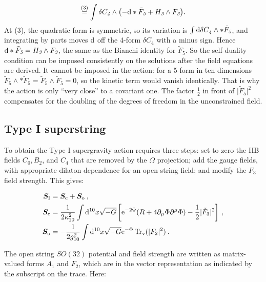 \begin{tcolorbox}[breakable]
\begin{remark}
\begin{align*}
			\overset{(3)}{=} \int\delta C_{\textit{4}}\wedge\bigl(-\mathrm{d}\ast\tilde F_{\textit{5}}+H_{\textit{3}}\wedge F_{\textit{3}}\bigr) .
		\end{align*}
		At (3), the quadratic form is symmetric, so its variation is $\int\mathrm{d}\delta C_{\textit{4}}\wedge\ast\tilde F_{\textit{5}}$, and integrating by parts moves $\mathrm{d}$ off the 4-form $\delta C_{\textit{4}}$ with a minus sign. Hence $\mathrm{d}\ast\tilde F_{\textit{5}}=H_{\textit{3}}\wedge F_{\textit{3}}$, the same as the Bianchi identity for $\tilde F_{\textit{5}}$. So the self-duality condition can be imposed consistently on the solutions after the field equations are derived. It cannot be imposed in the action: for a 5-form in ten dimensions $\tilde F_{\textit{5}}\wedge\ast\tilde F_{\textit{5}}=\tilde F_{\textit{5}}\wedge\tilde F_{\textit{5}}=0$, so the kinetic term would vanish identically. That is why the action is only ``very close'' to a covariant one. The factor $\frac12$ in front of $\lvert\tilde F_{\textit{5}}\rvert^{2}$ compensates for the doubling of the degrees of freedom in the unconstrained field.
	\end{remark}
\end{tcolorbox}

\subsection*{Type I superstring}
To obtain the Type I supergravity action requires three steps: set to zero the IIB fields $C_0, B_2$, and $C_4$ that are removed by the $\Omega$ projection; add the gauge fields, with appropriate dilaton dependence for an open string field; and modify the $F_3$ field strength. This gives:

\begin{subequations} \label{12.1.34}
	\begin{align}
		\bm{S}_{\text{I}} &= \bm{S}_{\text{c}} + \bm{S}_{\text{o}} \:, \label{12.1.34a} \\
		\bm{S}_{\text{c}} &= \frac{1}{2\kappa_{10}^{2}} \int \mathrm{d}^{10}x \sqrt{-G} \left[ \mathrm{e}^{-2\Phi} (R + 4\partial_{\mu}\Phi \partial^{\mu}\Phi) - \frac{1}{2} |\tilde{F}_3|^2 \right] \:, \label{12.1.34b} \\
		\bm{S}_{\text{o}} &= -\frac{1}{2g_{10}^{2}} \int \mathrm{d}^{10}x \sqrt{-G} \mathrm{e}^{-\Phi} \operatorname{Tr}_{\text{v}} (|F_2|^2) \:. \label{12.1.34c}
	\end{align}
\end{subequations}

The open string $SO(32)$ potential and field strength are written as matrix-valued forms $A_1$ and $F_2$, which are in the vector representation as indicated by the subscript on the trace. Here:


